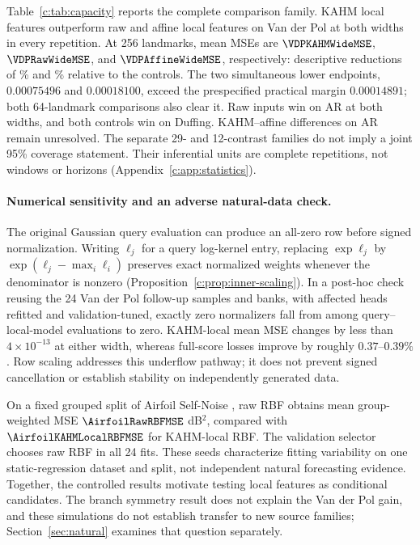 Table~\ref{c:tab:capacity} reports the complete comparison family. KAHM local features outperform raw and affine local features
on Van der Pol at both widths in every repetition. At 256 landmarks,
mean MSEs are $\VDPKAHMWideMSE$, $\VDPRawWideMSE$, and
$\VDPAffineWideMSE$, respectively: descriptive reductions of
\VDPRawWideRelativeGain\% and \VDPAffineWideRelativeGain\% relative to the
controls. The two simultaneous lower endpoints, $0.00075496$ and
$0.00018100$, exceed the prespecified practical margin $0.00014891$; both
64-landmark comparisons also clear it. Raw inputs win on AR at both
widths, and both controls win on Duffing. KAHM--affine differences on AR
remain unresolved. The separate 29- and 12-contrast families do not imply
a joint 95\% coverage statement. Their inferential units are complete
repetitions, not windows or horizons (Appendix~\ref{c:app:statistics}).

\paragraph{Numerical sensitivity and an adverse natural-data check.}
\label{c:sec:numerical}
The original Gaussian query evaluation can produce an all-zero row before
signed normalization. Writing $\ell_j$ for a query log-kernel entry, replacing
$\exp\ell_j$ by
$\exp(\ell_j-\max_i\ell_i)$ preserves exact normalized weights whenever
the denominator is nonzero (Proposition~\ref{c:prop:inner-scaling}). In a
post-hoc check reusing the 24 Van der Pol follow-up samples and banks, with
affected heads refitted and validation-tuned, exactly zero normalizers fall
from \NumericalOriginalZeroCount{} among \NumericalQueryClusterCount{}
query--local-model evaluations to zero. KAHM-local mean MSE changes by
less than $4\times10^{-13}$ at either width, whereas full-score losses
improve by roughly $0.37$--$0.39\%$. Row scaling addresses this underflow
pathway; it does not prevent signed cancellation or establish stability on independently generated data.

On a fixed grouped split of Airfoil Self-Noise \citep{Brooks1989Airfoil},
raw RBF obtains mean group-weighted MSE $\AirfoilRawRBFMSE$ dB$^2$,
compared with $\AirfoilKAHMLocalRBFMSE$ for KAHM-local RBF. The validation selector chooses
raw RBF in all 24 fits. These seeds characterize fitting variability on
one static-regression dataset and split, not independent natural
forecasting evidence. Together, the controlled results motivate testing
local features as conditional candidates. The branch symmetry result does not explain the Van der Pol gain,
and these simulations do not establish transfer to new source families;
Section~\ref{sec:natural} examines that question separately.
